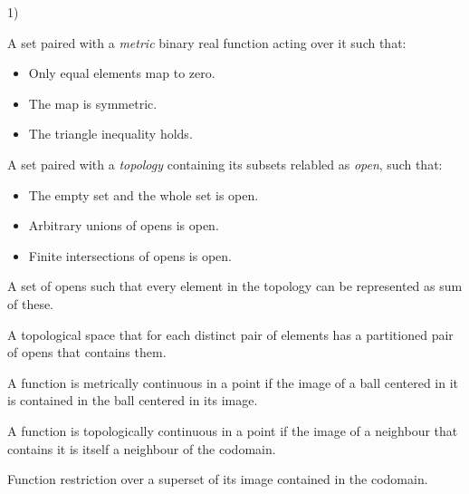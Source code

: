 \begin{multicols}{3}
  1)
\end{multicols}

\begin{multicols*}{3}
  A set paired with a \textit{metric} binary real function acting over it such that:
  \begin{itemize}
  \item Only equal elements map to zero.
  \item The map is symmetric.
  \item The triangle inequality holds.
  \end{itemize}

  A set paired with a \textit{topology} containing its subsets relabled as \textit{open}, such that:
  \begin{itemize}
  \item The empty set and the whole set is open.
  \item Arbitrary unions of opens is open.
  \item Finite intersections of opens is open.
  \end{itemize}

  A set of opens such that every element in the topology can be represented as sum of these.

  A topological space that for each distinct pair of elements has a partitioned pair of opens that contains them.

  A function is metrically continuous in a point if the image of a ball centered in it is contained in the ball centered in its image.

  A function is topologically continuous in a point if the image of a neighbour that contains it is itself a neighbour of the codomain.

  Function restriction over a superset of its image contained in the codomain.
  

\end{multicols*}


